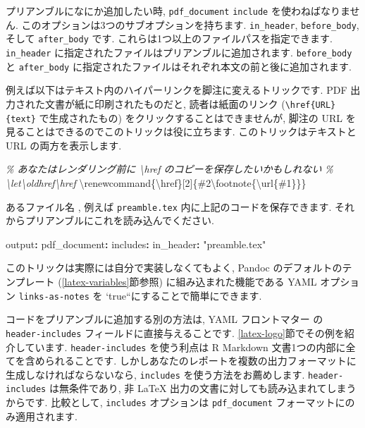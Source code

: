 \documentclass[
  11pt,
]{bxjsreport}
\newenvironment{Shaded}{\begin{snugshade}}{\end{snugshade}}
\newcommand{\AttributeTok}[1]{\textcolor[rgb]{0.77,0.63,0.00}{#1}}
\newcommand{\CommentTok}[1]{\textcolor[rgb]{0.56,0.35,0.01}{\textit{#1}}}
\newcommand{\ExtensionTok}[1]{#1}
\newcommand{\FunctionTok}[1]{\textcolor[rgb]{0.00,0.00,0.00}{#1}}
\newcommand{\KeywordTok}[1]{\textcolor[rgb]{0.13,0.29,0.53}{\textbf{#1}}}
\newcommand{\NormalTok}[1]{#1}
\newcommand{\StringTok}[1]{\textcolor[rgb]{0.31,0.60,0.02}{#1}}
\begin{document}
プリアンブルになにか追加したい時, \texttt{pdf\_document} \texttt{include} を使わねばなりません. このオプションは3つのサブオプションを持ちます. \texttt{in\_header}, \texttt{before\_body}, そして \texttt{after\_body} です. これらは1つ以上のファイルパスを指定できます. \texttt{in\_header} に指定されたファイルはプリアンブルに追加されます. \texttt{before\_body} と \texttt{after\_body} に指定されたファイルはそれぞれ本文の前と後に追加されます.

例えば以下はテキスト内のハイパーリンクを脚注に変えるトリックです. PDF 出力された文書が紙に印刷されたものだと, 読者は紙面のリンク (\texttt{\textbackslash{}href\{URL\}\{text\}} で生成されたもの) をクリックすることはできませんが, 脚注の URL を見ることはできるのでこのトリックは役に立ちます. このトリックはテキストと URL の両方を表示します.

\begin{Shaded}
\begin{Highlighting}[]
\CommentTok{\% あなたはレンダリング前に \textbackslash{}href のコピーを保存したいかもしれない}
\CommentTok{\% \textbackslash{}let\textbackslash{}oldhref\textbackslash{}href}
\FunctionTok{\textbackslash{}renewcommand}\NormalTok{\{}\ExtensionTok{\textbackslash{}href}\NormalTok{\}[2]\{\#2}\FunctionTok{\textbackslash{}footnote}\NormalTok{\{}\FunctionTok{\textbackslash{}url}\NormalTok{\{\#1\}\}\}}
\end{Highlighting}
\end{Shaded}

あるファイル名 , 例えば \texttt{preamble.tex} 内に上記のコードを保存できます. それからプリアンブルにこれを読み込んでください.

\begin{Shaded}
\begin{Highlighting}[]
\FunctionTok{output}\KeywordTok{:}
\AttributeTok{  }\FunctionTok{pdf\_document}\KeywordTok{:}
\AttributeTok{    }\FunctionTok{includes}\KeywordTok{:}
\AttributeTok{      }\FunctionTok{in\_header}\KeywordTok{:}\AttributeTok{ }\StringTok{"preamble.tex"}
\end{Highlighting}
\end{Shaded}

このトリックは実際には自分で実装しなくてもよく, Pandoc のデフォルトのテンプレート (\ref{latex-variables}節参照) に組み込まれた機能である YAML オプション \texttt{links-as-notes} を `true``にすることで簡単にできます.

コードをプリアンブルに追加する別の方法は, YAML フロントマター の \texttt{header-includes} フィールドに直接与えることです. \ref{latex-logo}節でその例を紹介しています. \texttt{header-includes} を使う利点は R Markdown 文書1つの内部に全てを含められることです. しかしあなたのレポートを複数の出力フォーマットに生成しなければならないなら, \texttt{includes} を使う方法をお薦めします. \texttt{header-includes} は無条件であり, 非 LaTeX 出力の文書に対しても読み込まれてしまうからです. 比較として, \texttt{includes} オプションは \texttt{pdf\_document} フォーマットにのみ適用されます.
\end{document}
